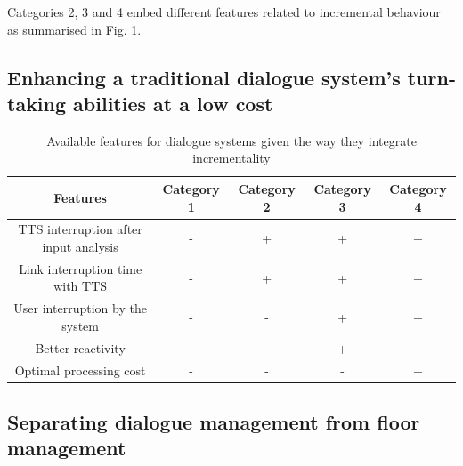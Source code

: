 		Categories 2, 3 and 4 embed different features related to incremental behaviour as summarised in Fig. \ref{tab:incrclassif}.

	\subsection{Enhancing a traditional dialogue system's turn-taking abilities at a low cost}
    
      \begin{table}[!ht]
      	\footnotesize
        \centering
        \begin{tabular}{|c|c|c|c|c|}
          \hline
          \textbf{Features}	& \textbf{Category 1} & \textbf{Category 2} & \textbf{Category 3} & \textbf{Category 4} \\
          \hline
          TTS interruption after input analysis & - & + & + & + \\
          \hline
          Link interruption time with TTS & - & + & + & + \\
          \hline
          User interruption by the system & - & - & + & + \\
          \hline
          Better reactivity & - & - & + & + \\
          \hline
          Optimal processing cost & - & - & - & + \\
          \hline
        \end{tabular}
        \caption{Available features for dialogue systems given the way they integrate incrementality}
        \label{tab:incrclassif}
      \end{table}
    
    \subsection{Separating dialogue management from floor management}
    
    
    
    
    
    
    
    
    
    
    
    
    
    
    
    
    
    
